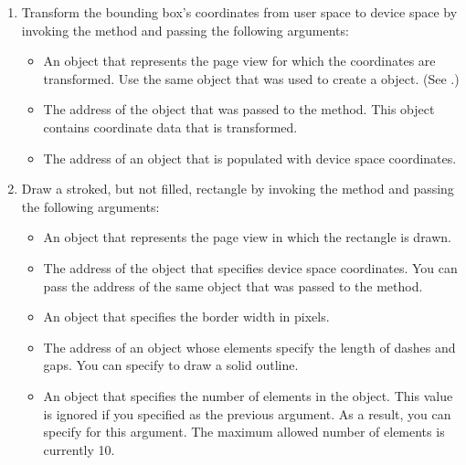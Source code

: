 \documentclass[letterpaper,12pt,english,openany,oneside]{sphinxmanual}
\begin{document}
\begin{enumerate}
%
\setcounter{enumi}{1}
\item {} 
Transform the bounding box’s coordinates from user space to device space by invoking the  method and passing the following arguments:
\begin{itemize}
\item {} 
An  object that represents the page view for which the coordinates are transformed. Use the same  object that was used to create a  object. (See .)

\item {} 
The address of the  object that was passed to the  method. This object contains coordinate data that is transformed.

\item {} 
The address of an  object that is populated with device space coordinates.

\end{itemize}

\item {} 
Draw a stroked, but not filled, rectangle by invoking the  method and passing the following arguments:
\begin{itemize}
\item {} 
An  object that represents the page view in which the rectangle is drawn.

\item {} 
The address of the  object that specifies device space coordinates. You can pass the address of the same  object that was passed to the  method.

\item {} 
An  object that specifies the border width in pixels.

\item {} 
The address of an  object whose elements specify the length of dashes and gaps. You can specify  to draw a solid outline.

\item {} 
An  object that specifies the number of elements in the  object. This value is ignored if you specified  as the previous argument. As a result, you can specify  for this argument. The maximum allowed number of elements is currently 10.

\end{itemize}

\end{enumerate}
\end{document}
